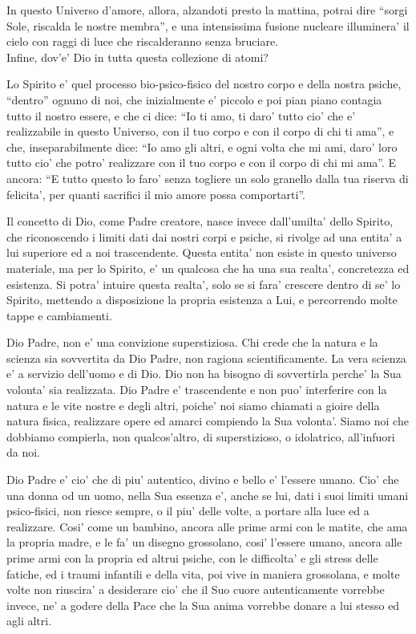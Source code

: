 In questo Universo d'amore, allora, alzandoti presto la mattina, potrai dire ``sorgi Sole, riscalda le nostre membra'', e una intensissima fusione nucleare illuminera' il cielo con raggi di luce che riscalderanno senza bruciare.\\

Infine, dov'e' Dio in tutta questa collezione di atomi? 

Lo Spirito e' quel processo bio-psico-fisico del nostro corpo e della nostra psiche, ``dentro'' ognuno di noi, che inizialmente e' piccolo e poi pian piano contagia tutto il nostro essere, e che ci dice: ``Io ti amo, ti daro' tutto cio' che e' realizzabile in questo Universo, con il tuo corpo e con il corpo di chi ti ama'', e che, inseparabilmente dice: ``Io amo gli altri, e ogni volta che mi ami, daro' loro tutto cio' che potro' realizzare con il tuo corpo e con il corpo di chi mi ama''. E ancora: ``E tutto questo lo faro' senza togliere un solo granello dalla tua riserva di felicita', per quanti sacrifici il mio amore possa comportarti''.

Il concetto di Dio, come Padre creatore, nasce invece dall'umilta' dello Spirito, che riconoscendo i limiti dati dai nostri corpi e psiche, si rivolge ad una entita' a lui superiore ed a noi trascendente. Questa entita' non esiste in questo universo materiale, ma per lo Spirito, e' un qualcosa che ha una sua realta', concretezza ed esistenza. Si potra' intuire questa realta', solo se si fara' crescere dentro di se' lo Spirito, mettendo a disposizione la propria esistenza a Lui, e percorrendo molte tappe e cambiamenti.

Dio Padre, non e' una convizione superstiziosa. Chi crede che la natura e la scienza sia sovvertita da Dio Padre, non ragiona scientificamente. La vera scienza e' a servizio dell'uomo e di Dio. Dio non ha bisogno di sovvertirla perche' la Sua volonta' sia realizzata. Dio Padre e' trascendente e non puo' interferire con la natura e le vite nostre e degli altri, poiche' noi siamo chiamati a gioire della natura fisica, realizzare opere ed amarci compiendo la Sua volonta'. Siamo noi che dobbiamo compierla, non qualcos'altro, di superstizioso, o idolatrico, all'infuori da noi. 

Dio Padre e' cio' che di piu' autentico, divino e bello e' l'essere umano. Cio' che una donna od un uomo, nella Sua essenza e', anche se lui, dati i suoi limiti umani psico-fisici, non riesce sempre, o il piu' delle volte, a portare alla luce ed a realizzare. Cosi' come un bambino, ancora alle prime armi con le matite, che ama la propria madre, e le fa' un disegno grossolano, cosi' l'essere umano, ancora alle prime armi con la propria ed altrui psiche, con le difficolta' e gli stress delle fatiche, ed i traumi infantili e della vita, poi vive in maniera grossolana, e molte volte non riuscira' a desiderare cio' che il Suo cuore autenticamente vorrebbe invece, ne' a godere della Pace che la Sua anima vorrebbe donare a lui stesso ed agli altri.

